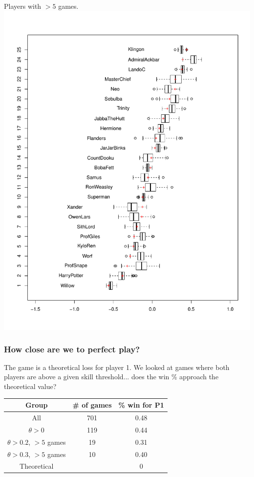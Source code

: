 \documentclass{beamer}
\begin{document}
\begin{frame}
\begin{center}
Players with $ > 5$ games.
\includegraphics[scale = 0.3]{../prediction/ranking_filtered.pdf}
\end{center}
\end{frame}

\begin{frame}
\frametitle{How close are we to perfect play?}
The game is a theoretical loss for player 1.
We looked at games where both players are above a given skill threshold... does the win \% approach the theoretical value?

\begin{center}
\begin{tabular}{c|c|c}\hline
Group & \# of games & \% win for P1\\ \hline
All & 701 & 0.48\\ \hline
$\theta > 0$ & 119 & 0.44\\ \hline
$\theta > 0.2$, $>5$ games & 19 & 0.31 \\ \hline
$\theta > 0.3$, $>5$ games & 10 & 0.40 \\ \hline
Theoretical & & 0 \\ \hline
\end{tabular}
\end{center}
\end{frame}
\end{document}
